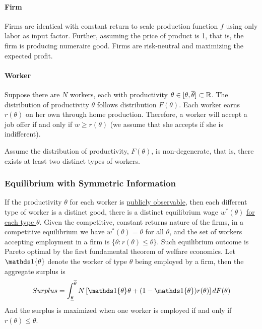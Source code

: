 \documentclass{report}
\begin{document}
		\paragraph{Firm} Firms are identical with constant return to scale production function $f$ using only labor as input factor. Further, assuming the price of product is 1, that is, the firm is producing numeraire good. Firms are risk-neutral and maximizing the expected profit.
		
		\paragraph{Worker} Suppose there are $N$ workers, each with productivity $\theta \in [\underline{\theta}, \overline{\theta}] \subset \mathbb{R}$. The distribution of productivity $\theta$ follows distribution $F(\theta)$. Each worker earns $r(\theta)$ on her own through home production. Therefore, a worker will accept a job offer if and only if $w \geq r(\theta)$ (we assume that she accepts if she is indifferent).
		
		\begin{assumption}
			Assume the distribution of productivity, $F(\theta)$, is non-degenerate, that is, there exists at least two distinct types of workers.
		\end{assumption}
		
		\subsubsection{Equilibrium with Symmetric Information}
		\par If the productivity $\theta$ for each worker is \ul{publicly observable}, then each different type of worker is a distinct good, there is a distinct equilibrium wage $w^*(\theta)$ \ul{for each type $\theta$}. Given the competitive, constant returns nature of the firms, in a competitive equilibrium we have $w^*(\theta) = \theta$ for all $\theta$, and the set of workers accepting employment in a firm is $\{\theta: r(\theta) \leq \theta \}$. Such equilibrium outcome is Pareto optimal by the first fundamental theorem of welfare economics. Let $\id{\theta}$ denote the worker of type $\theta$ being employed by a firm, then the aggregate surplus is
		\begin{equation}
			Surplus = \int_{\underline{\theta}}^{\overline{\theta}} N \left [
				\id{\theta} \theta + (1-\id{\theta})r(\theta)
			\right ] dF(\theta)
		\end{equation}
		And the surplus is maximized when one worker is employed if and only if $r(\theta) \leq \theta$.
		
\end{document}
